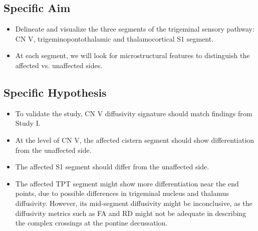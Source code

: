 \subsection{Specific Aim}
\begin{itemize}
    \item Delineate and visualize the three segments of the trigeminal sensory pathway: CN V, trigeminopontothalamic and  thalamocortical S1 segment. 
    \item At each segment, we will look for microstructural features to distinguish the affected vs. unaffected sides.
\end{itemize}

\subsection{Specific Hypothesis}
\begin{itemize}
    \item To validate the study, CN V diffusivity signature should match findings from Study I.
    \item At the level of CN V, the affected cistern segment should show differentiation from the unaffected side.
    \item The affected S1 segment should differ from the unaffected side.
    \item The affected TPT segment might show more differentiation near the end points, due to possible differences in trigeminal nucleus and thalamus diffusivity. However, its mid-segment diffusivity might be inconclusive, as the diffusivity metrics such as FA and RD might not be adequate in describing the complex crossings at the pontine decussation. 
\end{itemize}
